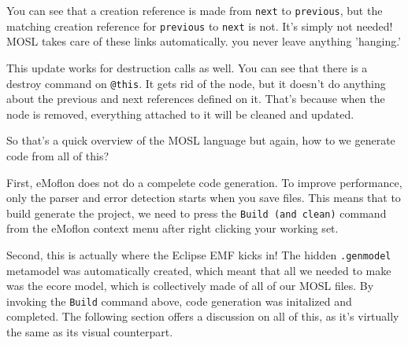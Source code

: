 You can see that a creation reference is made from \texttt{next} to \texttt{previous}, but the matching creation reference for \texttt{previous} to
\texttt{next} is not. It's simply not needed! MOSL takes care of these links automatically. you never leave anything 'hanging.'

This update works for destruction calls as well. You can see that there is a destroy command on \texttt{@this}. It gets rid of the node, but it doesn't do
anything about the previous and next references defined on it. That's because when the node is removed, everything attached to it will be cleaned and updated.
 
So that's a quick overview of the MOSL language but again, how to we generate code from all of this?

First, eMoflon does not do a compelete code generation. To improve performance, only the parser and error detection starts when you save files. This means that
to build generate the project, we need to press the \texttt{Build (and clean)} command from the eMoflon context menu after right clicking your working set.


Second, this is actually where the Eclipse EMF kicks in! The hidden \texttt{.genmodel} metamodel was automatically created, which meant that all we needed to
make was the ecore model, which is collectively made of all of our MOSL files. By invoking the \texttt{Build} command above, code generation was initalized and
completed. The following section offers a discussion on all of this, as it's virtually the same as its visual counterpart.
